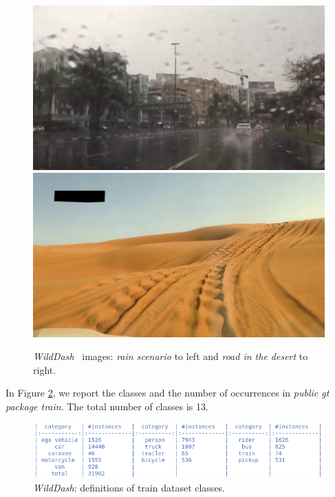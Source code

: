 \documentclass[10pt,twocolumn,letterpaper]{article}
\begin{document}
\begin{figure}[H]
\centering
\includegraphics[width=0.4\linewidth]{./image/wd_rain.jpg} \quad \includegraphics[width=0.4\linewidth]{./image/wd_desert.jpg}
\caption{\textit{WildDash}~\cite{wildDash} images:  \textit{rain scenario} to left and \textit{road in the desert} to right.}
 \label{fig:image_wd}
\noindent
\end{figure}
In Figure \ref{fig:class_definitions_wd}, we report the classes and the number of occurrences in \textit{public gt package train}. The total number of classes is 13.
\begin{figure}[H]
\centering
  \includegraphics[width=0.95\linewidth]{./image/wd_class.png} 
  \caption{\textit{WildDash}: definitions of train dataset classes.} %
  \label{fig:class_definitions_wd}
\noindent
\end{figure}
\end{document}
